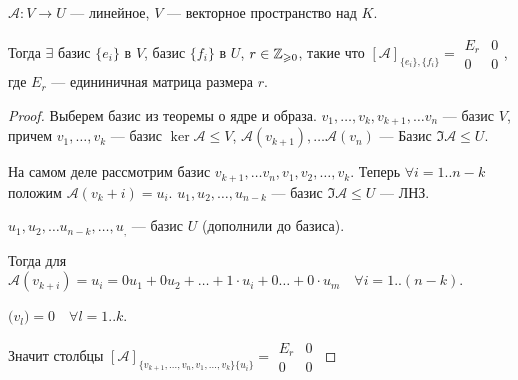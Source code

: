 \begin{theorem}
    $\mathcal{A}\!: V \to U$ --- линейное,  $V$ --- векторное пространство над  $K$.

    Тогда $\exists$ базис $\{e_i\}$ в  $V$, базис  $\{f_i\}$ в  $U$,  $r \in \mathbb{Z}_{\geqslant 0}$, такие что $[\mathcal{A}]_{\{e_i\}, \{f_i\}} = \begin{array}{|c|c|} E_r & 0 \\ \hline 0 & 0 \end{array}$, где $E_r$ --- едининичная матрица размера  $r$.
\end{theorem}
\begin{proof}
    Выберем базис из теоремы о ядре и образа. $v_1, \ldots, v_k, v_{k+1}, \ldots v_n$ --- базис $V$, причем  $v_1, \ldots, v_k$ --- базис $\ker \mathcal{A} \le V$,  $\mathcal{A}(v_{k+1}), \ldots \mathcal{A}(v_n)$ --- Базис $\Im \mathcal{A} \le U$.

    На самом деле рассмотрим базис $v_{k+1}, \ldots v_n, v_1, v_2, \ldots, v_k$. Теперь $\forall i = 1..n - k$ положим $\mathcal{A}(v_k + i) = u_i$.  $u_1, u_2, \ldots, u_{n-k}$ --- базис $\Im \mathcal{A} \le U$ --- ЛНЗ.

    $u_1, u_2, \ldots u_{n-k}, \ldots, u_,$ --- базис $U$ (дополнили до базиса).

    Тогда для  $\mathcal{A}(v_{k+i}) = u_i = 0 u_1 + 0 u_2 + \ldots + 1 \cdot u_i + 0 \ldots + 0 \cdot u_m\quad \forall i = 1..(n-k)$.

    $\mathcal(v_l) = 0 \quad \forall l=1..k$.

    Значит столбцы  $[\mathcal{A}]_{\{v_{k+1}, \ldots, v_n, v_1,\ldots, v_k\} \{u_i\}} =  \begin{array}{|c|c|} E_r & 0 \\ \hline 0 & 0 \end{array}$
\end{proof}

